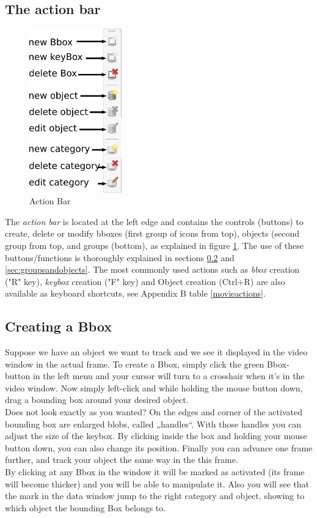 \subsection{The action bar}
   \begin{figure}
         \includegraphics[width=4cm]{images/actionbar_final}
      \caption{Action Bar}
      \label{img:actionbar}
      \vspace{-1cm}
   \end{figure}
 The \emph{action bar} is located at the left edge and contains the controls (buttons) to create, delete or modify bboxes (first group of icons from top), objects (second group from top, and groups (bottom), as explained in figure \ref{img:actionbar}. The use of these buttons/functions is thoroughly explained in sections \ref{sec:bboxes} and \ref{sec:groupsandobjects}. The most commonly used actions such as \emph{bbox} creation ("R" key), \emph{keybox} creation ("F" key) and Object creation (Ctrl+R) are also available as keyboard shortcuts, see Appendix B table \ref{movieactions}.
\subsection{Creating a Bbox}
\label{sec:bboxes}
Suppose we have an object we want to track and we see it displayed in the video window in the actual frame. To create a Bbox, simply click the green Bbox-button in the left menu and your cursor will turn to a crosshair when it's in the video window. Now simply left-click and while holding the mouse button down, drag a bounding box around your desired object. \\
Does not look exactly as you wanted? On the edges and corner of the activated bounding box are enlarged blobs, called „handles“. With those handles you can adjust the size of the keybox. By clicking inside the box and holding your mouse button down, you can also change its position. Finally you can advance one frame further, and track your object the same way in the this frame.\\
By clicking at any Bbox in the window it will be marked as activated (its frame will become thicker) and you will be able to manipulate it. Also you will see that the mark in the data window jump to the right category and object, showing to which object the bounding Box belongs to.

